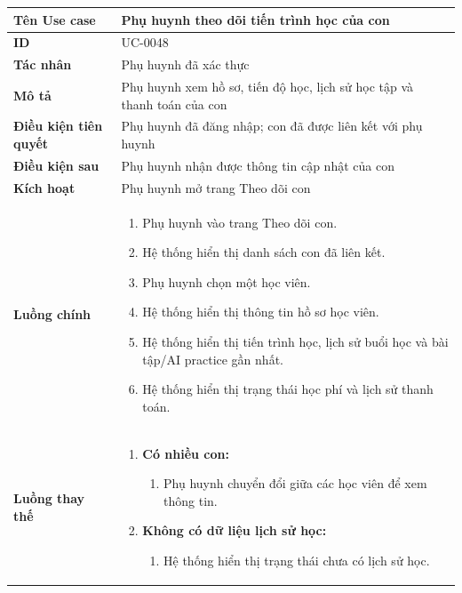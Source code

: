 {
\renewcommand{\arraystretch}{1.5}

\begin{tabularx}{\textwidth}{|>{\raggedright\arraybackslash}X|>{\raggedright\arraybackslash}X|}
\hline
\textbf{Tên Use case} & Phụ huynh theo dõi tiến trình học của con \\
\hline
\textbf{ID} & UC-0048 \\
\hline
\textbf{Tác nhân} & Phụ huynh đã xác thực \\
\hline
\textbf{Mô tả} & Phụ huynh xem hồ sơ, tiến độ học, lịch sử học tập và thanh toán của con \\
\hline
\textbf{Điều kiện tiên quyết} & Phụ huynh đã đăng nhập; con đã được liên kết với phụ huynh \\
\hline
\textbf{Điều kiện sau} & Phụ huynh nhận được thông tin cập nhật của con \\
\hline
\textbf{Kích hoạt} & Phụ huynh mở trang Theo dõi con \\
\hline
\textbf{Luồng chính} &
\begin{enumerate}
    \item Phụ huynh vào trang Theo dõi con.
    \item Hệ thống hiển thị danh sách con đã liên kết.
    \item Phụ huynh chọn một học viên.
    \item Hệ thống hiển thị thông tin hồ sơ học viên.
    \item Hệ thống hiển thị tiến trình học, lịch sử buổi học và bài tập/AI practice gần nhất.
    \item Hệ thống hiển thị trạng thái học phí và lịch sử thanh toán.
\end{enumerate} \\
\hline
\textbf{Luồng thay thế} &
\begin{enumerate}
    \item \textbf{Có nhiều con:}
    \begin{enumerate}
        \item[3A.] Phụ huynh chuyển đổi giữa các học viên để xem thông tin.
    \end{enumerate}
    \item \textbf{Không có dữ liệu lịch sử học:}
    \begin{enumerate}
        \item[5B.] Hệ thống hiển thị trạng thái chưa có lịch sử học.
    \end{enumerate}
\end{enumerate} \\

\end{tabularx}}
